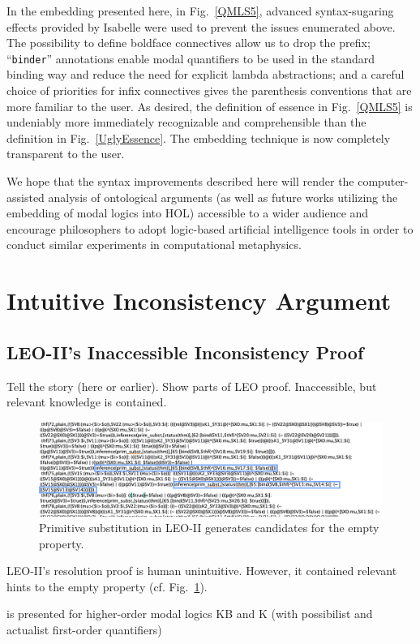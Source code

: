 \documentclass{article}
\begin{document}
In the embedding presented here, in Fig.~\ref{QMLS5}, advanced syntax-sugaring effects provided by Isabelle were used to prevent the issues enumerated above. The possibility to define boldface connectives allow us to drop the prefix; ``\texttt{binder}'' annotations enable modal quantifiers to be used in the standard binding way and reduce the need for explicit lambda abstractions; and a careful choice of priorities for infix connectives gives the parenthesis conventions that are more familiar to the user. As desired, the definition of essence in Fig.~\ref{QMLS5} is undeniably more immediately recognizable and comprehensible than the definition in Fig.~\ref{UglyEssence}. The embedding technique is now completely transparent to the user.

We hope that the syntax improvements described here will render the computer-assisted analysis of ontological arguments (as well as future works utilizing the embedding of modal logics into HOL) accessible to a wider audience and encourage philosophers to adopt logic-based artificial intelligence tools in order to conduct similar experiments in computational metaphysics.


\section{Intuitive Inconsistency Argument}
\subsection{LEO-II's Inaccessible Inconsistency Proof}
Tell the story (here or earlier). Show parts of LEO proof.  Inaccessible, but relevant knowledge
is contained.
\begin{figure}
\centerline{\includegraphics[width=\textwidth]{./Images/LEO-Proof.png}}
\caption{Primitive substitution in LEO-II generates candidates for the
empty property.} \label{LEO-Proof}
\end{figure}
LEO-II's resolution proof is human unintuitive. However, it contained
relevant hints to the empty property (cf. Fig.~\ref{LEO-Proof}).


is presented
  for higher-order modal logics KB and K (with possibilist and
  actualist first-order quantifiers)
\end{document}
